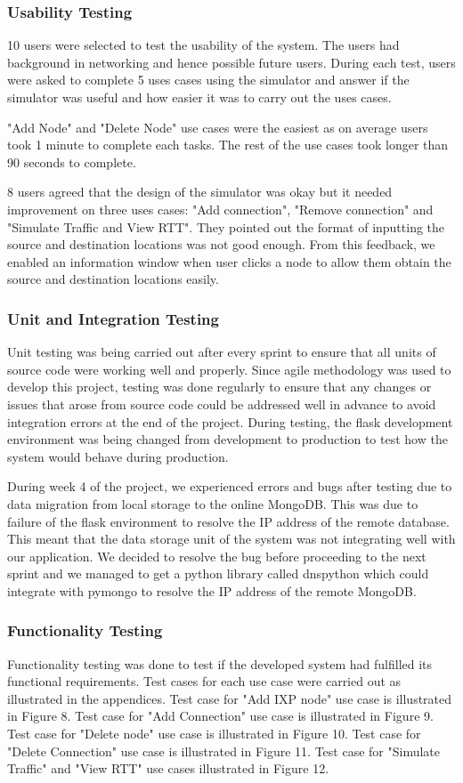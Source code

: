 \subsubsection{Usability Testing}
10 users were selected to test the usability of the system. The users had background in networking and hence possible future users. During each test, users were asked to complete 5 uses cases using the simulator and answer if the simulator was useful and how easier it was to carry out the uses cases. 

"Add Node" and "Delete Node" use cases were the easiest as on average users took 1 minute to complete each tasks. The rest of the use cases took longer than 90 seconds to complete.

8 users agreed that the design of the simulator was okay but it needed improvement on three uses cases: "Add connection", "Remove connection" and "Simulate Traffic and View RTT". They pointed out the format of inputting the source and destination locations was not good enough. From this feedback, we enabled an information window when user clicks a node to allow them obtain the source and destination locations easily. 
\subsubsection{Unit and Integration Testing }
Unit testing was being carried out after every sprint to ensure that all units of source code were working well and properly. Since agile methodology was used to develop this project, testing was done regularly to ensure that any changes or issues that arose from source code could be addressed well in advance to avoid integration errors at the end of the project. During testing, the flask development environment was being changed from development to production to test how the system would behave during production.

During week 4 of the project, we experienced errors and bugs after testing due to data migration from local storage to the online MongoDB. This was due to failure of the flask environment to resolve the IP address of the remote database. This meant that the data storage unit of the system was not integrating well with our application. We decided to resolve the bug before proceeding to the next sprint and we managed to get a python library called dnspython which could integrate with pymongo to resolve the IP address of the remote MongoDB.  
\subsubsection{Functionality Testing}
Functionality testing was done to test if the developed system had fulfilled its functional requirements. Test cases for each use case were carried out as illustrated in the appendices. Test case for "Add IXP node" use case is illustrated in Figure 8. Test case for "Add Connection" use case is illustrated in Figure 9. Test case for "Delete node" use case is illustrated in Figure 10. Test case for "Delete Connection" use case is illustrated in Figure 11. Test case for "Simulate Traffic" and "View RTT" use cases illustrated in Figure 12. 
